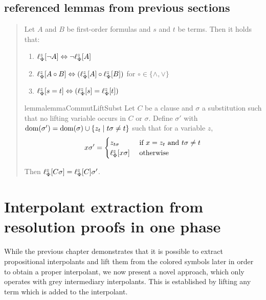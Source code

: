 \documentclass[,%
	draft=false,%
	numbers=noendperiod
	oneside,openany
	a4paper,
	11pt,
]{memoir}
\begin{document}
\section{referenced lemmas from previous sections}
\begin{quote}
\begin{lemma}
	\label{lemma:lift_commute}
	\label{lemma:lift_logic_commute}
	Let $A$ and $B$ be first-order formulas and $s$ and $t$ be terms. Then it     holds that:
	\begin{enumerate}
		\item $\lift{\Phi}{\lnot A}{z} \spas\semiff{} \lnot \lift{\Phi}{A}{z}$
		\item $\lift{\Phi}{A \circ B}{z} \spas\semiff{} ( \lift{\Phi}{A}{z} \circ   \lift{\Phi}{B}{z} )$ for  $\circ \in \{\land, \lor\}$
		\item $\lift{\Phi}{s = t}{z} \spas\semiff{} ( \lift{\Phi}{s}{z} =           \lift{\Phi}{t}{z} )$
	\end{enumerate}
\end{lemma}

\begin{restatable}{lemma}{lemmaCommutLiftSubst}
	\label{lemma:lif}
	Let $C$ be a clause and $\sigma$ a substitution such that no lifting variable occurs in $C$ or $\sigma$.
	Define $\sigma'$ with $\dom(\sigma') = \dom(\sigma) \cup \{ z_t \mid t\sigma \neq t \}$ such that for a variable $z$, 
	\[
		x \sigma' =
		\begin{cases} 
			z_{t\sigma} & \text{ if } x = z_t \text{ and } t\sigma \neq t \\
			\lifphi{x\sigma} & \text{ otherwise}
		\end{cases} 
	\]

	Then
	$\lifphi{C\sigma} =
	\lifphi{C}\sigma'$.
\end{restatable}
\end{quote}

\chapter{Interpolant extraction from resolution proofs in one phase} 


While the previous chapter demonstrates that it is possible to extract propositional interpolants and lift them from the colored symbols later in order to obtain a proper interpolant, we now present a novel approach, which only operates with grey intermediary interpolants.
This is established by lifting any term which is added to the interpolant. 
\end{document}
